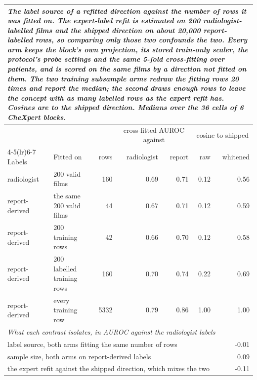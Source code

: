 \begin{table}[h]
\medskip
\setlength{\tabcolsep}{4pt}
\begin{tabular}{llrrrrr}
\toprule
\multicolumn{7}{p{0.95\linewidth}}{\textit{The label source of a refitted direction against the number of rows it was fitted on. The expert-label refit is estimated on 200 radiologist-labelled films and the shipped direction on about 20{,}000 report-labelled rows, so comparing only those two confounds the two. Every arm keeps the block's own projection, its stored train-only scaler, the protocol's probe settings and the same 5-fold cross-fitting over patients, and is scored on the same films by a direction not fitted on them. The two training subsample arms redraw the fitting rows 20 times and report the median; the second draws enough rows to leave the concept with as many labelled rows as the expert refit has. Cosines are to the shipped direction. Medians over the 36 cells of 6 CheXpert blocks.}} \\
\midrule
 & & & \multicolumn{2}{c}{cross-fitted AUROC against} & \multicolumn{2}{c}{cosine to shipped} \\
\cmidrule(lr){4-5}\cmidrule(lr){6-7}
Labels & Fitted on & rows & radiologist & report & raw & whitened \\
\midrule
radiologist & 200 valid films & 160 & 0.69 & 0.71 & 0.12 & 0.56 \\
report-derived & the same 200 valid films & 44 & 0.67 & 0.71 & 0.12 & 0.59 \\
report-derived & 200 training rows & 42 & 0.66 & 0.70 & 0.12 & 0.58 \\
report-derived & 200 labelled training rows & 160 & 0.70 & 0.74 & 0.22 & 0.69 \\
report-derived & every training row & 5332 & 0.79 & 0.86 & 1.00 & 1.00 \\
\midrule
\multicolumn{7}{l}{\textit{What each contrast isolates, in AUROC against the radiologist labels}} \\
\midrule
\multicolumn{6}{l}{label source, both arms fitting the same number of rows} & -0.01 \\
\multicolumn{6}{l}{sample size, both arms on report-derived labels} & 0.09 \\
\multicolumn{6}{l}{the expert refit against the shipped direction, which mixes the two} & -0.11 \\
\bottomrule
\end{tabular}
\end{table}
